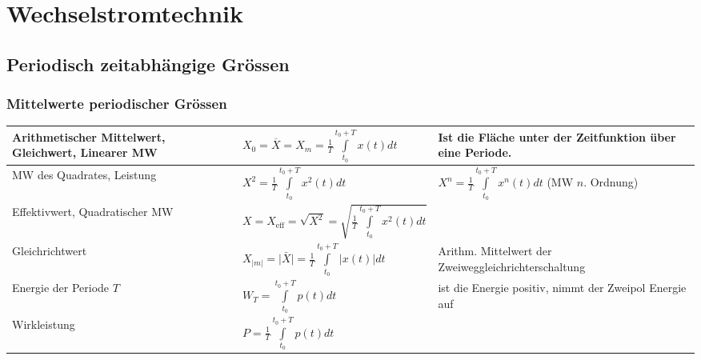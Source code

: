 \section{Wechselstromtechnik}
	\subsection{Periodisch zeitabh\"angige Gr\"ossen}
		

		\subsubsection{Mittelwerte periodischer Gr\"ossen}
			\begin{tabular}{|p{5.5cm}|p{6cm}|p{6.5cm}|}
			\hline
				Arithmetischer Mittelwert, Gleichwert, Linearer MW &
				$X_0 = \overline{X} = X_m = \frac {1} {T} \int\limits_{t_0}^{t_0+T} x(t)dt$ &
				Ist die Fl\"ache unter der Zeitfunktion \"uber eine Periode. \\
			\hline
				MW des Quadrates, Leistung &
				$X^2 = \frac {1} {T} \int\limits_{t_0}^{t_0+T} x^2(t)dt$ & 
				$X^n = \frac {1} {T} \int\limits_{t_0}^{t_0+T} x^n(t)dt$ (MW $n$. Ordnung) \\
			\hline
				Effektivwert, Quadratischer MW &
				$X = X_{\text{eff}}= \sqrt{X^2} = \sqrt{\frac{1}{T} \int\limits ^{t_0+T} _{t_0}{x^2(t)dt}}$
				& \\ 
			\hline
				Gleichrichtwert &
				$X_{|m|} = \bar{|X|} = \frac{1}{T} \int\limits_{t_0}^{t_0+T}{|x(t)| dt}$ &
				Arithm. Mittelwert der Zweiweggleichrichterschaltung \\
			\hline				    
				Energie der Periode $T$ &
				$W_T = \int\limits_{t_0}^{t_0+T}{p(t) dt}$ &
				ist die Energie positiv, nimmt der Zweipol Energie auf \\
			\hline                    
				Wirkleistung &
				$P = \frac{1}{T} \int\limits_{t_0}^{t_0+T}{p(t) dt}$ & \\
			\hline
			\end{tabular}
			
